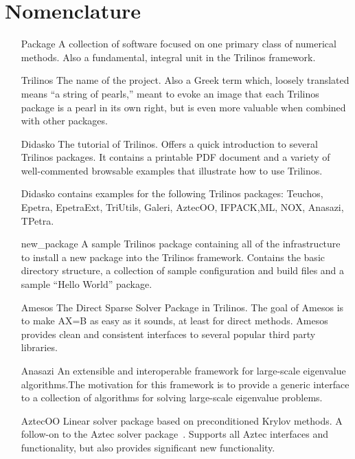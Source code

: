 \section*{Nomenclature}
\begin{itemize}

\item[Package]
A collection of software focused on one primary class of numerical
methods.  Also a fundamental, integral unit in the Trilinos framework.

\item[Trilinos]
The name of the project.  Also a Greek term which,
loosely translated means ``a string of pearls,'' 
meant to evoke an image that each Trilinos package is a pearl in its 
own right, but is even more valuable when combined with other 
packages.

\item[Didasko]
The tutorial of Trilinos.  Offers a quick introduction to several
Trilinos packages. It contains a printable PDF document and a
variety of well-commented browsable examples that illustrate how
to use Trilinos.

Didasko contains examples for the following Trilinos packages: 
Teuchos, Epetra, EpetraExt, TriUtils, Galeri, AztecOO, IFPACK,ML,
NOX, Anasazi, TPetra.

\item[new\_package] A sample Trilinos package containing all of the
infrastructure to install a new package into the Trilinos framework.
Contains the basic directory structure, a collection of sample
configuration and build files and a sample ``Hello World'' package.

\item[Amesos]
The Direct Sparse Solver Package in Trilinos. The goal of
Amesos is to make AX=B as easy as it sounds, at least for direct
methods. Amesos provides clean and consistent interfaces to 
several popular third party libraries.

\item[Anasazi]
An extensible and interoperable framework for large-scale eigenvalue
algorithms.The motivation for this framework is to provide a generic
interface to a collection of algorithms for solving large-scale 
eigenvalue problems.

\item[AztecOO] 
Linear solver package based on preconditioned Krylov methods.  A 
follow-on to the Aztec solver package~\cite{Aztec2.1}.  
Supports all Aztec 
interfaces and functionality, but also provides significant new 
functionality.


\end{itemize}
